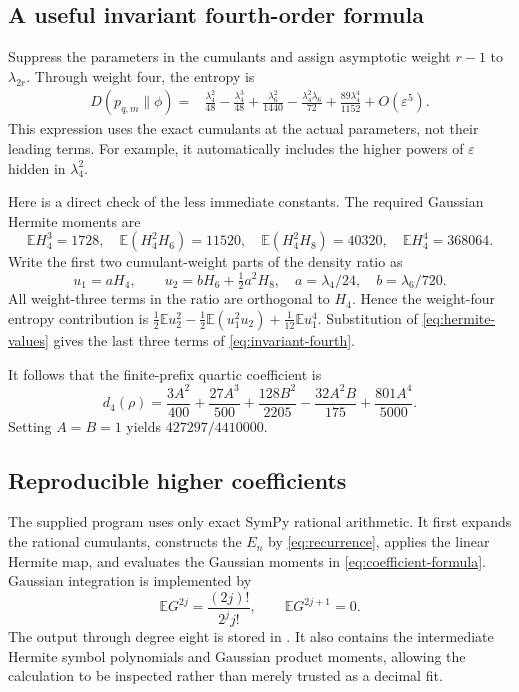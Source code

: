 \documentclass[11pt,a4paper]{article}
\numberwithin{equation}{section}
\theoremstyle{definition}
\theoremstyle{remark}
\newcommand{\E}{\mathbb E}
\newcommand{\eps}{\varepsilon}
\begin{document}
\subsection{A useful invariant fourth-order formula}

Suppress the parameters in the cumulants and assign asymptotic weight $r-1$
to $\lambda_{2r}$. Through weight four, the entropy is
\begin{align}
 D(p_{q,m}\|\phi)
 ={}&\frac{\lambda_4^2}{48}-\frac{\lambda_4^3}{48}
   +\frac{\lambda_6^2}{1440}
   -\frac{\lambda_4^2\lambda_6}{72}
   +\frac{89\lambda_4^4}{1152}
   +O(\eps^5).
 \label{eq:invariant-fourth}
\end{align}
This expression uses the exact cumulants at the actual parameters, not their
leading terms. For example, it automatically includes the higher powers of
$\eps$ hidden in $\lambda_4^2$.

Here is a direct check of the less immediate constants. The required Gaussian
Hermite moments are
\begin{equation}
 \E H_4^3=1728,\quad
 \E(H_4^2H_6)=11520,\quad
 \E(H_4^2H_8)=40320,\quad
 \E H_4^4=368064.
 \label{eq:hermite-values}
\end{equation}
Write the first two cumulant-weight parts of the density ratio as
\[
 u_1=aH_4,\qquad u_2=bH_6+\tfrac12a^2H_8,
 \quad a=\lambda_4/24,\quad b=\lambda_6/720.
\]
All weight-three terms in the ratio are orthogonal to $H_4$. Hence the
weight-four entropy contribution is
$\frac12\E u_2^2-\frac12\E(u_1^2u_2)+\frac1{12}\E u_1^4$.
Substitution of \eqref{eq:hermite-values} gives the last three terms of
\eqref{eq:invariant-fourth}.

It follows that the finite-prefix quartic coefficient is
\begin{equation}
 \boxed{\displaystyle
 d_4(\rho)=\frac{3A^2}{400}+\frac{27A^3}{500}
  +\frac{128B^2}{2205}-\frac{32A^2B}{175}
  +\frac{801A^4}{5000}.}
 \label{eq:prefix-fourth}
\end{equation}
Setting $A=B=1$ yields $427297/4410000$.

\subsection{Reproducible higher coefficients}

The supplied program  uses only exact SymPy rational
arithmetic. It first expands the rational cumulants, constructs the $E_n$ by
\eqref{eq:recurrence}, applies the linear Hermite map, and evaluates the
Gaussian moments in \eqref{eq:coefficient-formula}. Gaussian integration is
implemented by
\begin{equation}
 \E G^{2j}=\frac{(2j)!}{2^j j!},\qquad \E G^{2j+1}=0.
 \label{eq:normal-moments}
\end{equation}
The output through degree eight is stored in
. It also contains the intermediate Hermite
symbol polynomials and Gaussian product moments, allowing the calculation to be
inspected rather than merely trusted as a decimal fit.
\end{document}
